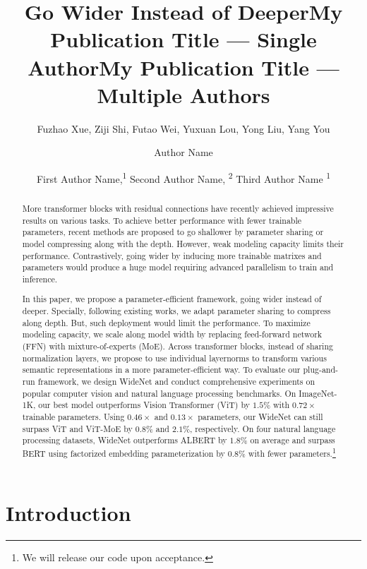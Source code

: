 \documentclass[letterpaper]{article} %
\title{Go Wider Instead of Deeper}
\author{
    Fuzhao Xue, 
        Ziji Shi,
        Futao Wei,
        Yuxuan Lou, 
        Yong Liu, 
        Yang You \\
}
\title{My Publication Title --- Single Author}
\author {
    Author Name
}
\title{My Publication Title --- Multiple Authors}
\author {
    First Author Name,\textsuperscript{\rm 1}
    Second Author Name, \textsuperscript{\rm 2}
    Third Author Name \textsuperscript{\rm 1}
}
\begin{document}
\maketitle

\begin{abstract}
More transformer blocks with residual connections have recently achieved impressive results on various tasks. To achieve better performance with fewer trainable parameters, recent methods are proposed to go shallower by parameter sharing or model compressing along with the depth. However, weak modeling capacity limits their performance. Contrastively, going wider by inducing more trainable matrixes and parameters would produce a huge model requiring advanced parallelism to train and inference.  


In this paper, we propose a parameter-efficient framework, going wider instead of deeper. Specially, following existing works, we adapt parameter sharing to compress along depth. But, such deployment would limit the performance. To maximize modeling capacity, we scale along model width by replacing feed-forward network (FFN) with mixture-of-experts (MoE). Across transformer blocks, instead of sharing normalization layers, we propose to use individual layernorms to transform various semantic representations in a more parameter-efficient way. To evaluate our plug-and-run framework, we design WideNet and conduct comprehensive experiments on popular computer vision and natural language processing benchmarks. On ImageNet-1K, our best model outperforms Vision Transformer (ViT) by $1.5\%$ with $0.72 \times$ trainable parameters. Using $0.46 \times$ and $0.13 \times$  parameters, our WideNet can still surpass ViT and ViT-MoE by $0.8\%$ and $2.1\%$, respectively. On four natural language processing datasets, WideNet outperforms ALBERT by $1.8\%$ on average and surpass BERT using factorized embedding parameterization by $0.8\%$ with fewer parameters.\footnote{We will release our code upon acceptance.}

\end{abstract}

\section{Introduction}
\label{sec:intro}
 
\end{document}
